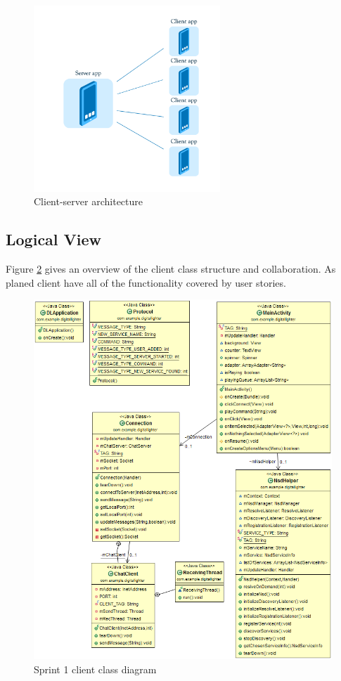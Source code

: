 \begin{figure}[H]
	\centering
		\includegraphics[width=7cm]{sprint1/arhitecture.png}
	\caption{Client-server architecture}
	\label{fig:sprint1_arhitecture}
\end{figure}

\subsection{Logical View}
Figure \ref{fig:class_diagram_client} gives an overview of the client class structure and collaboration. As planed client have all of the functionality covered by user stories. 

\begin{figure}[H]
	\centering
		\includegraphics[width=15cm]{sprint1/class_diagram_client.png}
	\caption{Sprint 1 client class diagram}
	\label{fig:class_diagram_client}
\end{figure}

